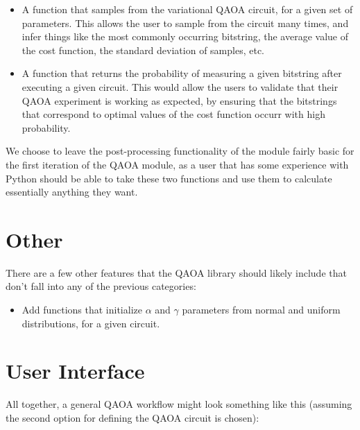 \documentclass{article}
\begin{document}
\begin{itemize}
	\item A function that samples from the variational QAOA circuit, for 
		a given set of parameters. This allows the user to sample from the 
		circuit many times, and infer things like the most commonly occurring 
		bitstring, the average value of the cost function, the standard deviation 
		of samples, etc.
	\item A function that returns the probability of measuring a given bitstring after executing 
		a given circuit. This would allow the users to validate that their QAOA experiment is working
		as expected, by ensuring that the bitstrings that correspond to optimal values of the cost 
		function occurr with high probability.
\end{itemize}

We choose to leave the post-processing functionality of the module fairly basic for the 
first iteration of the QAOA module, 
as a user that has some experience with Python should be able to take these two functions 
and use them to calculate essentially anything they want.

\section{Other}

There are a few other features that the QAOA library should likely include that don't fall into 
any of the previous categories:

\begin{itemize}
	\item Add functions that initialize $\alpha$ and $\gamma$ parameters from normal and uniform distributions, 
		for a given circuit.
\end{itemize}

\section{User Interface}

All together, a general QAOA workflow might look something like this (assuming the second 
option for defining the QAOA circuit is chosen):
\end{document}
